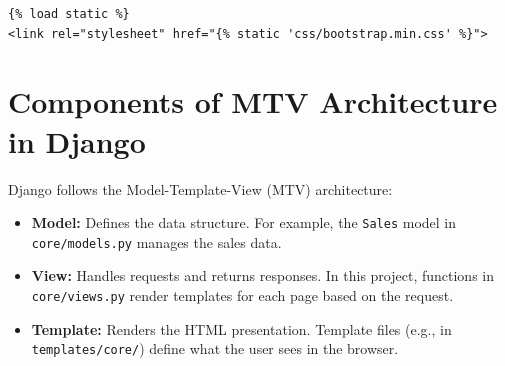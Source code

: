 \documentclass[12pt]{article}
\begin{document}
\begin{verbatim}
{% load static %}
<link rel="stylesheet" href="{% static 'css/bootstrap.min.css' %}">
\end{verbatim}

\section{Components of MTV Architecture in Django}
Django follows the Model-Template-View (MTV) architecture:
\begin{itemize}
    \item \textbf{Model:} Defines the data structure. For example, the \texttt{Sales} model in \texttt{core/models.py} manages the sales data.
    \item \textbf{View:} Handles requests and returns responses. In this project, functions in \texttt{core/views.py} render templates for each page based on the request.
    \item \textbf{Template:} Renders the HTML presentation. Template files (e.g., in \texttt{templates/core/}) define what the user sees in the browser.
\end{itemize}
\end{document}
